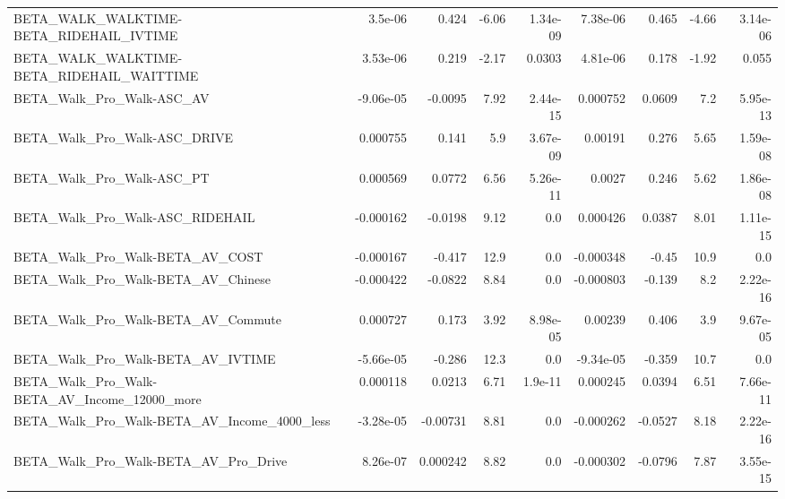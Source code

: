 \begin{tabular}{lrrrrrrrr}
BETA\_WALK\_WALKTIME-BETA\_RIDEHAIL\_IVTIME            &     3.5e-06 &        0.424 &     -6.06 & 1.34e-09 &   7.38e-06 &       0.465 &        -4.66 &      3.14e-06 \\
BETA\_WALK\_WALKTIME-BETA\_RIDEHAIL\_WAITTIME          &    3.53e-06 &        0.219 &     -2.17 &   0.0303 &   4.81e-06 &       0.178 &        -1.92 &         0.055 \\
BETA\_Walk\_Pro\_Walk-ASC\_AV                          &   -9.06e-05 &      -0.0095 &      7.92 & 2.44e-15 &   0.000752 &      0.0609 &          7.2 &      5.95e-13 \\
BETA\_Walk\_Pro\_Walk-ASC\_DRIVE                       &    0.000755 &        0.141 &       5.9 & 3.67e-09 &    0.00191 &       0.276 &         5.65 &      1.59e-08 \\
BETA\_Walk\_Pro\_Walk-ASC\_PT                          &    0.000569 &       0.0772 &      6.56 & 5.26e-11 &     0.0027 &       0.246 &         5.62 &      1.86e-08 \\
BETA\_Walk\_Pro\_Walk-ASC\_RIDEHAIL                    &   -0.000162 &      -0.0198 &      9.12 &      0.0 &   0.000426 &      0.0387 &         8.01 &      1.11e-15 \\
BETA\_Walk\_Pro\_Walk-BETA\_AV\_COST                    &   -0.000167 &       -0.417 &      12.9 &      0.0 &  -0.000348 &       -0.45 &         10.9 &           0.0 \\
BETA\_Walk\_Pro\_Walk-BETA\_AV\_Chinese                 &   -0.000422 &      -0.0822 &      8.84 &      0.0 &  -0.000803 &      -0.139 &          8.2 &      2.22e-16 \\
BETA\_Walk\_Pro\_Walk-BETA\_AV\_Commute                 &    0.000727 &        0.173 &      3.92 & 8.98e-05 &    0.00239 &       0.406 &          3.9 &      9.67e-05 \\
BETA\_Walk\_Pro\_Walk-BETA\_AV\_IVTIME                  &   -5.66e-05 &       -0.286 &      12.3 &      0.0 &  -9.34e-05 &      -0.359 &         10.7 &           0.0 \\
BETA\_Walk\_Pro\_Walk-BETA\_AV\_Income\_12000\_more       &    0.000118 &       0.0213 &      6.71 &  1.9e-11 &   0.000245 &      0.0394 &         6.51 &      7.66e-11 \\
BETA\_Walk\_Pro\_Walk-BETA\_AV\_Income\_4000\_less        &   -3.28e-05 &     -0.00731 &      8.81 &      0.0 &  -0.000262 &     -0.0527 &         8.18 &      2.22e-16 \\
BETA\_Walk\_Pro\_Walk-BETA\_AV\_Pro\_Drive               &    8.26e-07 &     0.000242 &      8.82 &      0.0 &  -0.000302 &     -0.0796 &         7.87 &      3.55e-15 \\

\end{tabular}
